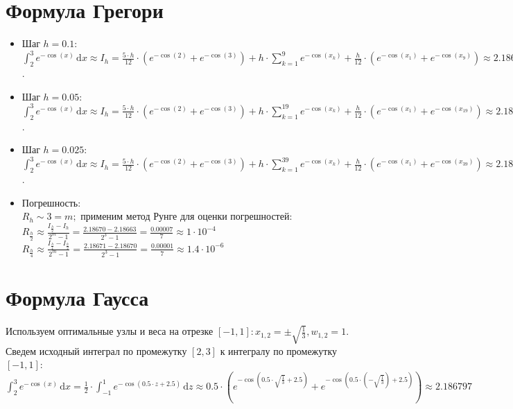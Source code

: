 \documentclass[12pt,a4paper]{article}
\begin{document}
    \section*{Формула Грегори}
        \begin{itemize}
            \item Шаг $h = 0.1$:\\
                $\int_2^3 \! e^{-\cos(x)} \, \mathrm{d}x \approx I_{h} = 
                \frac{5 \cdot h}{12} \cdot (e^{-\cos(2)} + e^{-\cos(3)}) + h \cdot
                \sum_{k=1}^{9} e^{-\cos(x_{k})} + \frac{h}{12} \cdot
                (e^{-\cos(x_{1})} + e^{-\cos(x_{9})}) \approx 2.18663$.
                
            \item Шаг $h = 0.05$:\\
                $\int_2^3 \! e^{-\cos(x)} \, \mathrm{d}x \approx I_{h} = 
                \frac{5 \cdot h}{12} \cdot (e^{-\cos(2)} + e^{-\cos(3)}) + h \cdot
                \sum_{k=1}^{19} e^{-\cos(x_{k})} + \frac{h}{12} \cdot
                (e^{-\cos(x_{1})} + e^{-\cos(x_{19})}) \approx 2.18670$.
                
            \item Шаг $h = 0.025$:\\
                $\int_2^3 \! e^{-\cos(x)} \, \mathrm{d}x \approx I_{h} = 
                \frac{5 \cdot h}{12} \cdot (e^{-\cos(2)} + e^{-\cos(3)}) + h \cdot
                \sum_{k=1}^{39} e^{-\cos(x_{k})} + \frac{h}{12} \cdot
                (e^{-\cos(x_{1})} + e^{-\cos(x_{39})}) \approx 2.18671$.
                
            \item Погрешность:\\
                $R_{h} \sim 3 = m;$ применим метод Рунге для оценки погрешностей:\\
                $R_{\frac{h}{2}} \approx \frac{I_{\frac{h}{2}} - I_{h}}{2^{m} - 1} =
                \frac{2.18670 - 2.18663}{2^3 - 1} = \frac{0.00007}{7} \approx 1 \cdot 10^{-4}$\\
                $R_{\frac{h}{4}} \approx \frac{I_{\frac{h}{4}} - I_{\frac{h}{2}}}{2^{m} - 1} =
                \frac{2.18671 - 2.18670}{2^3 - 1} = \frac{0.00001}{7} \approx 1.4 \cdot 10^{-6}$
        \end{itemize}
        
    \section*{Формула Гаусса}
        Используем оптимальные узлы и веса на отрезке $[-1, 1]: x_{1, 2} = \pm \sqrt{\frac{1}{3}},
        w_{1, 2} = 1$.\\
        Сведем исходный интеграл по промежутку $[2, 3]$ к интегралу по промежутку $[-1, 1]$:\\
        $\int_2^3 \! e^{-\cos(x)} \, \mathrm{d}x = \frac{1}{2} \cdot
        \int_{-1}^{1} \! e^{-\cos(0.5 \cdot z + 2.5)} \, \mathrm{d}z \approx
        0.5 \cdot (e^{-\cos(0.5 \cdot \sqrt{\frac{1}{3}} + 2.5)} + e^{-\cos(0.5 \cdot
        (-\sqrt{\frac{1}{3}}) + 2.5)}) \approx 2.186797$
    
\end{document}
